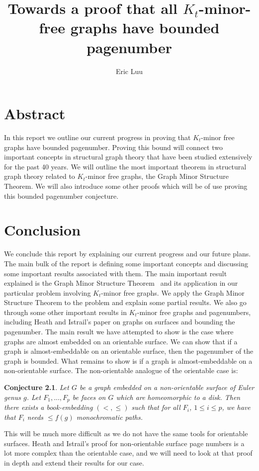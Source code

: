 \documentclass[]{report}
\title{Towards a proof that all \(K_t\)-minor-free graphs have bounded pagenumber}
\author{Eric Luu}
\newtheorem{conjecture}[theorem]{Conjecture}
\theoremstyle{definition}
\numberwithin{theorem}{section}
\numberwithin{equation}{section}
\begin{document}
\maketitle
\listoftodos
\tableofcontents
\chapter{Abstract}\label{abstract}
In this report we outline our current progress in proving that \(K_t\)-minor free graphs have bounded pagenumber. Proving this bound will connect two important concepts in structural graph theory that have been studied extensively for the past 40 years. We will outline the most important theorem in structural graph theory related to \(K_t\)-minor free graphs, the Graph Minor Structure Theorem. We will also introduce some other proofs which will be of use proving this bounded pagenumber conjecture. 




	
	
	



\chapter{Conclusion}\label{chap:conclusion}
We conclude this report by explaining our current progress and our future plans. 
The main bulk of the report is defining some important concepts and discussing some important results associated with them.
The main important result explained is the Graph Minor Structure Theorem~\cite{robertsonGraphMinorsXVI2003} and its application in our particular problem involving \(K_t\)-minor free graphs. We apply the Graph Minor Structure Theorem to the problem and explain some partial results.
We also go through some other important results in \(K_t\)-minor free graphs and pagenumbers, including Heath and Istrail's \cite{heathPagenumberGenusGraphs1992} paper on graphs on surfaces and bounding the pagenumber.
The main result we have attempted to show is the case where graphs are almost embedded on an orientable surface. We can show that if a graph is almost-embeddable on an orientable surface, then the pagenumber of the graph is bounded.
What remains to show is if a graph is almost-embeddable on a non-orientable surface. 
The non-orientable analogue of the orientable case is:
\begin{conjecture}
	Let $G$ be a graph embedded on a non-orientable surface of Euler genus $g$. Let $F_1, ..., F_p$ be faces on $G$ which are homeomorphic to a disk. Then there exists a book-embedding $(<, \leq)$ such that for all $F_i$, $1 \leq i \leq p$, we have that $F_i$ needs $\leq f(g)$ monochromatic paths. 
\end{conjecture}
This will be much more difficult as we do not have the same tools for orientable surfaces. Heath and Istrail's proof for non-orientable surface page numbers is a lot more complex than the orientable case, and we will need to look at that proof in depth and extend their results for our case.


\printbibliography{}
\end{document}
